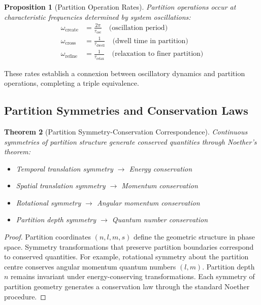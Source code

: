 \documentclass[11pt,a4paper]{article}
\newtheorem{theorem}{Theorem}[section]
\newtheorem{proposition}[theorem]{Proposition}
\theoremstyle{remark}
\begin{document}
\begin{proposition}[Partition Operation Rates]
\label{prop:partition_rates}
Partition operations occur at characteristic frequencies determined by system oscillations:
\begin{align}
\omega_{\text{create}} &= \frac{2\pi}{\tau_{\text{osc}}} \quad \text{(oscillation period)} \\
\omega_{\text{cross}} &= \frac{1}{\tau_{\text{dwell}}} \quad \text{(dwell time in partition)} \\
\omega_{\text{refine}} &= \frac{1}{\tau_{\text{relax}}} \quad \text{(relaxation to finer partition)}
\end{align}
\end{proposition}

These rates establish a connexion between oscillatory dynamics and partition operations, completing a triple equivalence.

\subsection{Partition Symmetries and Conservation Laws}

\begin{theorem}[Partition Symmetry-Conservation Correspondence]
\label{thm:partition_symmetry}
Continuous symmetries of partition structure generate conserved quantities through Noether's theorem:
\begin{itemize}
\item Temporal translation symmetry $\to$ Energy conservation
\item Spatial translation symmetry $\to$ Momentum conservation
\item Rotational symmetry $\to$ Angular momentum conservation
\item Partition depth symmetry $\to$ Quantum number conservation
\end{itemize}
\end{theorem}

\begin{proof}
Partition coordinates $(n, l, m, s)$ define the geometric structure in phase space. Symmetry transformations that preserve partition boundaries correspond to conserved quantities. For example, rotational symmetry about the partition centre conserves angular momentum quantum numbers $(l, m)$. Partition depth $n$ remains invariant under energy-conserving transformations. Each symmetry of partition geometry generates a conservation law through the standard Noether procedure.
\end{proof}
\end{document}
